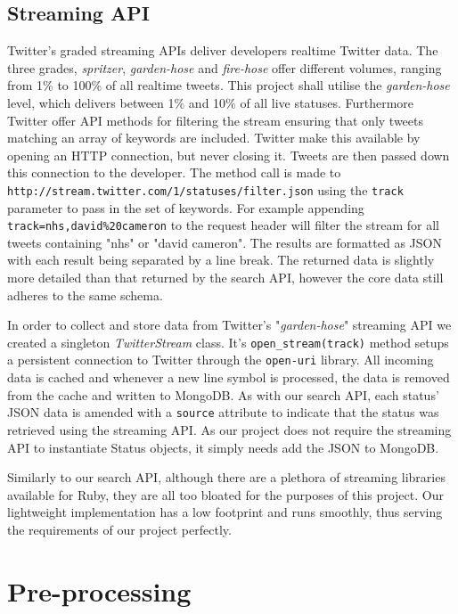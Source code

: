 \subsection{Streaming API}

Twitter's graded streaming APIs deliver developers realtime Twitter data. The three grades, \emph{spritzer}, \emph{garden-hose} and \emph{fire-hose} offer different volumes, ranging from 1\% to 100\% of all realtime tweets. This project shall utilise the \emph{garden-hose} level, which delivers between 1\% and 10\% of all live statuses. Furthermore Twitter offer API methods for filtering the stream ensuring that only tweets matching an array of keywords are included. Twitter make this available by opening an HTTP connection, but never closing it. Tweets are then passed down this connection to the developer. The method call is made to \texttt{http://\-stream\-.twitter\-.com\-/1\-/statuses\-/fi\-l\-ter\-.json} using the \texttt{track} parameter to pass in the set of keywords. For example appending \texttt{track=nhs,david\%20cameron} to the request header will filter the stream for all tweets containing "nhs" or "david cameron". The results are formatted as JSON with each result being separated by a line break. The returned data is slightly more detailed than that returned by the search API, however the core data still adheres to the same schema.

In order to collect and store data from Twitter's "\emph{garden-hose}" streaming API we created a singleton \emph{TwitterStream} class. It's \texttt{open\-\_stream\-(track)} method setups a persistent connection to Twitter through the \texttt{open-uri} library. All incoming data is cached and whenever a new line symbol is processed, the data is removed from the cache and written to MongoDB. As with our search API, each status' JSON data is amended with a \texttt{source} attribute to indicate that the status was retrieved using the streaming API. As our project does not require the streaming API to instantiate Status objects, it simply needs add the JSON to MongoDB.

Similarly to our search API, although there are a plethora of streaming libraries available for Ruby, they are all too bloated for the purposes of this project. Our lightweight implementation has a low footprint and runs smoothly, thus serving the requirements of our project perfectly.

\section{Pre-processing}
\label{subjectivity:pre-processing}

